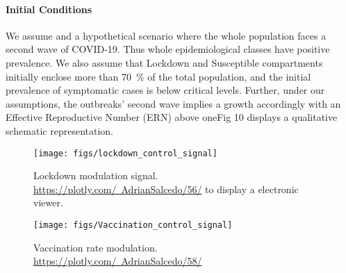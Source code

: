 \paragraph*{Initial Conditions}
    We assume and a hypothetical scenario where the whole population faces a second wave of COVID-19. 
    Thus whole epidemiological classes have positive prevalence. We also assume that Lockdown and Susceptible 
    compartments initially enclose more than \SI{70}{\percent} of the total population, and the initial
    prevalence of symptomatic cases is below critical levels. Further, under our assumptions, the outbreaks'
    second wave implies a growth accordingly with an Effective Reproductive Number (ERN) 
    above one\textemdash Fig 10 displays a qualitative schematic representation.

%
%



\begin{figure*}[tbh]
    \centering
    \texttt{[image: figs/lockdown\_control\_signal]}
    \caption[Lockdown modulation signal.]{Lockdown modulation signal.
    \href{https://plotly.com/~AdrianSalcedo/56/}
    {https://plotly.com/~AdrianSalcedo/56/}
            to display a electronic viewer.}
    \label{fig:lockdowncontrolsignal}
\end{figure*}

\begin{figure}
    \centering
    \texttt{[image: figs/Vaccination\_control\_signal]}
    \caption[Vaccination rate modulation.]{Vaccination rate modulation.
    \href{https://plotly.com/~AdrianSalcedo/58/}
    {https://plotly.com/~AdrianSalcedo/58/}}
    \label{fig:vaccinationcontrolsignal}
\end{figure}

